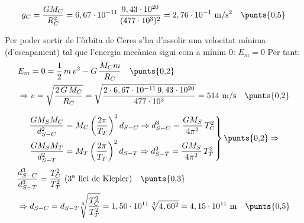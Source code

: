 \begin{solapartat}
\[ g_C = \frac{GM_C}{R_C^2} = 6,67\cdot 10^{-11}\,\frac{9,43\cdot 10^{20}}{(477\cdot 10^{3})^2} = 2,76\cdot 10^{-1}\ \mathrm{m/s^2} \quad \text{\punts{0,5}} \]

Per poder sortir de l'òrbita de Ceres s'ha d'assolir una velocitat mínima (d'escapament) tal que l'energia mecànica sigui com a mínim 0: $E_m = 0$  Per tant:
\begin{align*}
&E_m = 0 = \frac{1}{2}\,m\,v^2 - G\,\frac{M_C m}{R_C} \quad \text{\punts{0,2}}\\
&\Rightarrow v = \sqrt{\frac{2\,G\,M_C}{R_C}} = \sqrt{\frac{2\cdot 6,67\cdot 10^{-11}\,9,43\cdot 10^{20}}{477\cdot 10^{3}}} = 514\ \mathrm{m/s} \quad \text{\punts{0,2}}
\end{align*}
\end{solapartat}

\begin{solapartat}
\[ \left.\begin{aligned}
\frac{GM_SM_C}{d_{S-C}^2} &= M_C\left(\frac{2\pi}{T_T}\right)^2 d_{S-C} \Rightarrow d_{S-C}^3 = \frac{GM_S}{4\pi^2}\,T_C^2\\
\frac{GM_SM_T}{d_{S-T}^2} &= M_T\left(\frac{2\pi}{T_T}\right)^2 d_{S-T} \Rightarrow d_{S-T}^3 = \frac{GM_S}{4\pi^2}\,T_T^2
\end{aligned}\right\} \text{\punts{0,2}} \Rightarrow \]
\begin{align*}
&\frac{d_{S-C}^3}{d_{S-T}^3} = \frac{T_C^2}{T_T^2}\ \text{(3\textsuperscript{a} llei de Klepler)} \quad \text{\punts{0,3}}\\
&\Rightarrow d_{S-C} = d_{S-T}\sqrt[3]{\frac{T_C^2}{T_T^2}} = 1,50\cdot 10^{11}\,\sqrt[3]{4,60^2} = 4,15\cdot 10^{11}\ \mathrm{m} \quad \text{\punts{0,5}}
\end{align*}
\end{solapartat}
